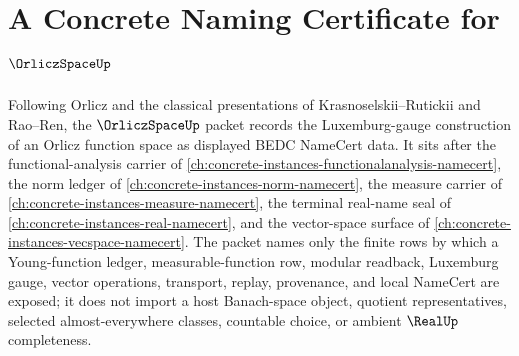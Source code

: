 \chapter{A Concrete Naming Certificate for $\OrliczSpaceUp$}
\label{ch:concrete-instances-orlicz-space-namecert}

Following Orlicz and the classical presentations of Krasnoselskii--Rutickii and Rao--Ren, the $\OrliczSpaceUp$ packet records the Luxemburg-gauge construction of an Orlicz function space as displayed BEDC NameCert data. It sits after the functional-analysis carrier of \autoref{ch:concrete-instances-functionalanalysis-namecert}, the norm ledger of \autoref{ch:concrete-instances-norm-namecert}, the measure carrier of \autoref{ch:concrete-instances-measure-namecert}, the terminal real-name seal of \autoref{ch:concrete-instances-real-namecert}, and the vector-space surface of \autoref{ch:concrete-instances-vecspace-namecert}. The packet names only the finite rows by which a Young-function ledger, measurable-function row, modular readback, Luxemburg gauge, vector operations, transport, replay, provenance, and local NameCert are exposed; it does not import a host Banach-space object, quotient representatives, selected almost-everywhere classes, countable choice, or ambient $\RealUp$ completeness.

